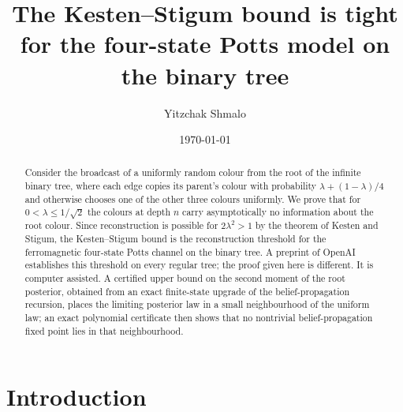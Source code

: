 \documentclass[11pt]{amsart}
\title{The Kesten--Stigum bound is tight for the four-state Potts model on the binary tree}
\author{Yitzchak Shmalo}
\date{\today}
\theoremstyle{definition}
\theoremstyle{remark}
\begin{document}
\begin{abstract}
Consider the broadcast of a uniformly random colour from the root of the infinite binary tree, where
each edge copies its parent's colour with probability $\lambda+(1-\lambda)/4$ and otherwise chooses one
of the other three colours uniformly. We prove that for $0<\lambda\le 1/\sqrt2$ the colours at depth
$n$ carry asymptotically no information about the root colour. Since reconstruction is possible for
$2\lambda^2>1$ by the theorem of Kesten and Stigum, the Kesten--Stigum bound is the reconstruction
threshold for the ferromagnetic four-state Potts channel on the binary tree. A preprint of OpenAI
establishes this threshold on every regular tree; the proof given here is different. It is computer
assisted. A certified upper bound on the second moment of the root posterior, obtained from an exact
finite-state upgrade of the belief-propagation recursion, places the limiting posterior law in a small
neighbourhood of the uniform law; an exact polynomial certificate then shows that no nontrivial
belief-propagation fixed point lies in that neighbourhood.
\end{abstract}

\maketitle

\section{Introduction}
\end{document}
